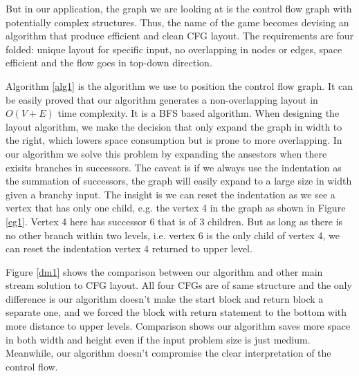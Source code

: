 \documentclass[conference,10pt,twocolumn]{./IEEE/IEEEtran}
\begin{document}
But in our application, the graph we are looking at is the control flow graph with potentially complex structures. Thus, the name of the game becomes devising an algorithm that produce efficient and clean CFG layout. The requirements are four folded: unique layout for specific input, no overlapping in nodes or edges, space efficient and the flow goes in top-down direction.

Algorithm \ref{alg1} is the algorithm we use to position the control flow graph. It can be easily proved that our algorithm generates a non-overlapping layout in $O (V+E)$ time complexity. It is a BFS based algorithm. When designing the layout algorithm, we make the decision that only expand the graph in width to the right, which lowers space consumption but is prone to more overlapping. In our algorithm we solve this problem by expanding the ansestors when there exisits branches in successors. The caveat is if we always use the indentation as the summation of successors, the graph will easily expand to a large size in width given a branchy input. The insight is we can reset the indentation as we see a vertex that has only one child, e.g. the vertex 4 in the graph as shown in Figure \ref{eg1}. Vertex 4 here has successor 6 that is of 3 children. But as long as there is no other branch within two levels, i.e. vertex 6 is the only child of vertex 4, we can reset the indentation vertex 4 returned to upper level.

Figure \ref{dm1} shows the comparison between our algorithm and other main stream solution to CFG layout. All four CFGs are of same structure and the only difference is our algorithm doesn't make the start block and return block a separate one, and we forced the block with return statement to the bottom with more distance to upper levels. Comparison shows our algorithm saves more space in both width and height even if the input problem size is just medium. Meanwhile, our algorithm doesn't compromise the clear interpretation of the control flow.
\end{document}
